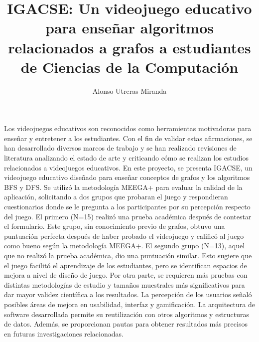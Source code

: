 \documentclass{umemoria}
\author{Alonso Utreras Miranda}
\title{IGACSE: Un videojuego educativo para enseñar algoritmos relacionados a grafos a estudiantes de Ciencias de la Computación}
\begin{document}
\frontmatter
\maketitle

\begin{resumen}
Los videojuegos educativos son reconocidos como herramientas motivadoras para enseñar y entretener a los estudiantes. Con el fin de validar estas afirmaciones, se han desarrollado diversos marcos de trabajo y se han realizado revisiones de literatura analizando el estado de arte y criticando cómo se realizan los estudios relacionados a videojuegos educativos. En este proyecto, se presenta IGACSE, un videojuego educativo diseñado para enseñar conceptos de grafos y los algoritmos BFS y DFS. Se utilizó la metodología MEEGA+  para evaluar la calidad de la aplicación, solicitando a dos grupos que probaran el juego y respondieran cuestionarios donde se le pregunta a los participantes por su percepción respecto del juego. El primero (N=15) realizó una prueba académica después de contestar el formulario. Este grupo, sin conocimiento previo de grafos, obtuvo una puntuación perfecta después de haber probado el videojuego y calificó al juego como bueno según la metodología MEEGA+. El segundo grupo (N=13), aquel que no realizó la prueba académica, dio una puntuación similar. Esto sugiere que el juego facilitó el aprendizaje de los estudiantes, pero se identifican espacios de mejora a nivel de diseño de juego. Por otra parte, se requieren más pruebas con distintas metodologías de estudio y tamaños muestrales más significativos para dar mayor validez científica a los resultados. La percepción de los usuarios señaló posibles áreas de mejora en usabilidad, interfaz y gamificación. La arquitectura de software desarrollada permite su reutilización con otros algoritmos y estructuras de datos. Además, se proporcionan pautas para obtener resultados más precisos en futuras investigaciones relacionadas.


\end{resumen}


\end{document}
